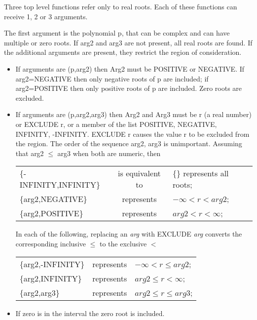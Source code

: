Three top level functions refer only to real roots.  Each of these
functions can receive 1, 2 or 3 arguments.

The first argument is the polynomial p, that can be complex and can
have multiple or zero roots.  If arg2 and arg3 are not present, all real
roots are found.  If the additional arguments are present, they restrict
the region of consideration.
                                                    
\begin{itemize}
\item If arguments are (p,arg2) then
Arg2 must be POSITIVE or NEGATIVE.  If arg2=NEGATIVE then only
negative roots of p are included; if arg2=POSITIVE then only positive
roots of p are included. Zero roots are excluded.

\item If arguments are (p,arg2,arg3) then
   
Arg2 and Arg3 must be r (a real number) or  EXCLUDE r,  or a member of
the list POSITIVE, NEGATIVE, INFINITY, -INFINITY.  EXCLUDE r causes the
value r to be excluded from the region.  The order of the sequence
arg2, arg3 is unimportant.  Assuming that arg2 $\leq$ arg3 when both are
numeric, then

\begin{tabular}{l c l}
\{-INFINITY,INFINITY\} & is equivalent to & \{\} represents all roots; \\
\{arg2,NEGATIVE\} & represents & $-\infty < r < arg2$; \\
\{arg2,POSITIVE\} & represents & $arg2 < r < \infty$;
\end{tabular}

In each of the following, replacing an {\em arg} with EXCLUDE {\em arg}
converts the corresponding inclusive $\leq$ to the exclusive $<$

\begin{tabular}{l c l}
\{arg2,-INFINITY\} & represents & $-\infty < r \leq arg2$; \\
\{arg2,INFINITY\} & represents & $arg2 \leq r < \infty$; \\
\{arg2,arg3\} & represents & $arg2 \leq r \leq arg3$;
\end{tabular}

\item If zero is in the interval the zero root is included.
\end{itemize}

